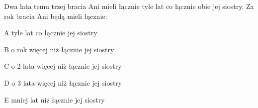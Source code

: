 \begin{tresc}
Dwa lata temu trzej bracia Ani mieli łącznie tyle lat co łącznie obie jej siostry. Za rok bracia Ani będą mieli łącznie:
\end{tresc}
\begin{wariant}{A} tyle lat co łącznie jej siostry \end{wariant}
\begin{wariant}{B} o rok więcej niż łącznie jej siostry \end{wariant}
\begin{wariant}{C} o 2 lata więcej niż łącznie jej siostry \end{wariant}
\begin{wariant}{D} o 3 lata więcej niż łącznie jej siostry \end{wariant}
\begin{wariant}{E} mniej lat niż łącznie jej siostry \end{wariant}
